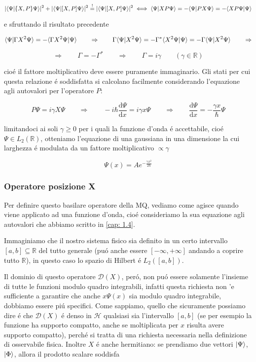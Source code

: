 \begin{enumerate}
$$|\normalsize\langle \Psi \normalsize| \{X,P\} \Psi \normalsize\rangle|^2 + |\normalsize\langle \Psi \normalsize| [X,P] \Psi \normalsize\rangle|^2 \stackrel{{!}}{{=}} |\normalsize\langle \Psi \normalsize| [X,P] \Psi \normalsize\rangle|^2 \iff \normalsize\langle \Psi \normalsize| XP\Psi \normalsize\rangle = -\normalsize\langle \Psi \normalsize| PX\Psi \normalsize\rangle = -\normalsize\langle XP\Psi \normalsize| \Psi \normalsize\rangle$$

e sfruttando il risultato precedente

$$\normalsize\langle \Psi \normalsize| \Gamma X^2 \Psi \normalsize\rangle = - \normalsize\langle \Gamma X^2 \Psi \normalsize| \Psi \normalsize\rangle \qquad \Rightarrow \qquad \Gamma\normalsize\langle \Psi \normalsize| X^2 \Psi \normalsize\rangle = -\Gamma^* \normalsize\langle X^2 \Psi \normalsize| \Psi \normalsize\rangle = -\Gamma \normalsize\langle \Psi \normalsize| X^2 \Psi \normalsize\rangle \qquad\Rightarrow $$

$$\Rightarrow \qquad \Gamma=-\Gamma^* \qquad \Rightarrow \qquad \Gamma = i\gamma \qquad (\gamma\in \mathbb{R})$$

cio\'e il fattore moltiplicativo deve essere puramente immaginario. Gli stati per cui questa relazione \'e soddisfatta si calcolano facilmente considerando l'equazione agli autovalori per l'operatore $P$:

$$P\Psi = i\gamma X\Psi \qquad \Rightarrow \qquad −i\hbar \frac{\mathrm{d}\Psi}{\mathrm{d}x} = i\gamma x\Psi \qquad\Rightarrow\qquad \frac{\mathrm{d}\Psi}{\mathrm{d}x} = −\frac{\gamma x}{\hbar}\Psi$$
	
limitandoci ai soli $\gamma \geq 0$ per i quali la funzione d'onda \'e accettabile, cio\'e $\Psi \in L_2(\mathbb{R})$, otteniamo l'equazione di una gaussiana in una dimensione la cui larghezza \'e modulata da un fattore moltiplicativo $\propto \gamma$
	
$$\Psi(x)=A e^{-{\frac{\gamma x^{2}}{2\hbar}}}$$
	
	
\subsubsection{Operatore posizione X}
	
Per definire questo basilare operatore della MQ, vediamo come agisce quando viene applicato ad una funzione d'onda, cio\'e consideriamo la sua equazione agli autovalori che abbiamo scritto in \ref{cap: 1.4}.

Immaginiamo che il nostro sistema fisico sia definito in un certo intervallo $[a, b] \subseteq \mathbb{R}$ del tutto generale (pu\'o anche essere $[−\infty, +\infty]$ andando a coprire tutto $\mathbb{R}$), in questo caso lo spazio di Hilbert \'e $L_2([a, b])$.

Il dominio di questo operatore $\mathcal{D}(X)$, per\'o, non pu\'o essere solamente l'insieme di tutte le funzioni modulo quadro integrabili, infatti questa richiesta non 'e sufficiente a garantire che anche $x\Psi(x)$ sia modulo quadro integrabile, dobbiamo essere pi\'u specifici. Come sappiamo, quello che sicuramente possiamo dire \'e che $\mathcal{D}(X)$ \'e denso in $\mathcal{H}$ qualsiasi sia l'intervallo $[a, b]$ (se per esempio la funzione ha supporto compatto, anche se moltiplicata per $x$ risulta avere supporto compatto), perch\'e si tratta di una richiesta necessaria nella definizione di osservabile fisica. Inoltre $X$ \'e anche hermitiano: se prendiamo due vettori $\normalsize| \Psi \normalsize\rangle$, $\normalsize| \Phi \normalsize\rangle$, allora il prodotto scalare soddisfa
	

\end{enumerate}
